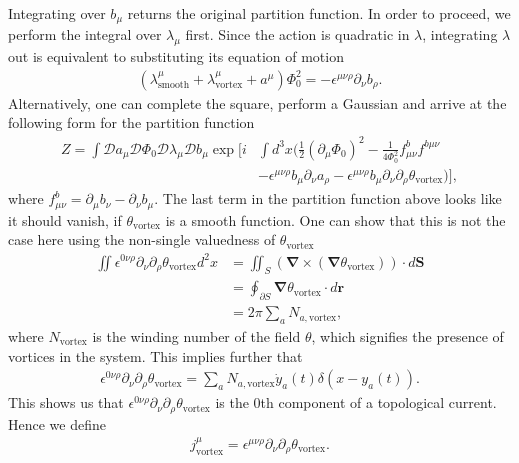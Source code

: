 Integrating over $b_{\mu}$ returns the original partition function. In order to proceed, we perform the integral over $\lambda_{\mu}$ first. Since the action is quadratic in $\lambda$, integrating $\lambda$ out is equivalent to substituting its equation of motion
\begin{align}
    \left(\lambda^{\mu}_{\text{smooth}} +\lambda^{\mu}_{\text{vortex}} +a^{\mu} \right) \Phi_0^2=- \epsilon^{\mu \nu \rho} \partial_{\nu} b_{\rho}.
\end{align}
Alternatively, one can complete the square, perform a Gaussian and arrive at the following form for the partition function
\begin{align}
    Z= \int \mathcal{D}a_{\mu} \mathcal{D}\Phi_0 \mathcal{D} \lambda_{\mu} \mathcal{D} b_{\mu} \exp\bigg[i& \int d^3x \bigg(\frac{1}{2} \left(\partial_{\mu} \Phi_0 \right)^2- \frac{1}{4\Phi_0^2} f_{\mu\nu}^{b} f^{b \mu \nu} \nonumber\\
    &- \epsilon^{\mu \nu \rho} b_{\mu} \partial_{\nu} a_{\rho} -\epsilon^{\mu \nu \rho} b_{\mu} \partial_{\nu} \partial_{\rho} \theta_{\text{vortex}}  \bigg) \bigg],
\end{align}
 where $f_{\mu \nu}^{b} = \partial_{\mu} b_{\nu} - \partial_{\nu} b_{\mu}$. The last term in the partition function above looks like it should vanish, if $\theta_{\text{vortex}}$ is a smooth function. One can show that this is not the case here using the non-single valuedness of $\theta_{\text{vortex}}$   
\begin{align}
    \iint \epsilon^{0 \nu \rho} \partial_{\nu} \partial_{\rho} \theta_{\text{vortex}} d^2x&=\iint_{S} \left( { \bm \nabla} \times ({ \bm \nabla} \theta_{\text{vortex}})\right) \cdot d{ \bm S}\nonumber\\
    &= \oint_{\partial S} {\bm \nabla} \theta_{\text{vortex}}\cdot d {\bm r}  \nonumber \\
    &= 2\pi \sum_{a} N_{a,\text{vortex}},
\end{align}
where $N_{\text{vortex}}$ is the winding number of the field $\theta$, which signifies the presence of vortices in the system. This implies further that 
\begin{align}
    \epsilon^{0 \nu \rho} \partial_{\nu} \partial_{\rho} \theta_{\text{vortex}} =\sum_{a} N_{a,\text{vortex}} \dot{y}_a(t)  \delta\left(x-y_a(t) \right).
\end{align}
This shows us that $\epsilon^{0 \nu \rho} \partial_{\nu} \partial_{\rho} \theta_{\text{vortex}}$ is the $0$th component of a topological current. Hence we define
\begin{align}
    j^{\mu}_{\text{vortex}} = \epsilon^{\mu \nu \rho} \partial_{\nu} \partial_{\rho} \theta_{\text{vortex}}.
\end{align}
